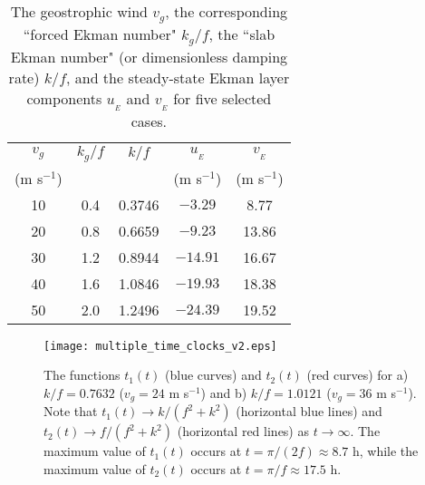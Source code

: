 \documentclass[10pt]{article}
\begin{document}
\begin{table}[b!t]                        %
\centering
{\begin{tabular}{ccccc}
\hline\hline %
     $v_g$   & $k_g/f$ & $k/f$  & $u_{_E}$   & $v_{_E}$    \\
 (m s$^{-1}$)&         &        &(m s$^{-1}$)&(m s$^{-1}$) \\
\hline %
       10    &  0.4    & 0.3746 &  $ -3.29$  &     8.77    \\
       20    &  0.8    & 0.6659 &  $ -9.23$  &    13.86    \\
       30    &  1.2    & 0.8944 &  $-14.91$  &    16.67    \\
       40    &  1.6    & 1.0846 &  $-19.93$  &    18.38    \\
       50    &  2.0    & 1.2496 &  $-24.39$  &    19.52    \\
\hline %
\end{tabular}}
\caption{The geostrophic wind $v_g$, the corresponding ``forced Ekman number"
$k_g/f$, the ``slab Ekman number" (or dimensionless damping rate) $k/f$,
and the steady-state Ekman layer components $u_{_E}$ and $v_{_E}$ for five selected
cases.}
\end{table}

\begin{figure}[b!t]                          %
\centerline{\texttt{[image: multiple\_time\_clocks\_v2.eps]}}
\caption{The functions $t_1(t)$ (blue curves) and $t_2(t)$ (red curves)
for a) $k/f = 0.7632$ ($v_g=24$ m s$^{-1}$) and b) $k/f = 1.0121$ ($v_g=36$ m s$^{-1}$).
Note that $t_1(t)\rightarrow k/(f^2+k^2)$
(horizontal blue lines) and $t_2(t)\rightarrow f/(f^2+k^2)$ (horizontal red lines)
as $t \rightarrow\infty$.  The maximum value of $t_1(t)$ occurs at $t=\pi/(2f)\approx 8.7$ h,
while the maximum value of $t_2(t)$ occurs at $t=\pi/f\approx 17.5$ h.}
\end{figure}
\end{document}
